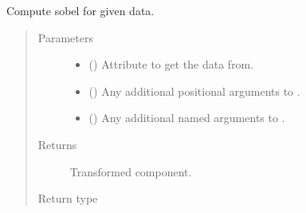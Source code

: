 \documentclass[letterpaper,10pt,english]{sphinxmanual}
\begin{document}
\begin{fulllineitems}
\begin{fulllineitems}
\label{\detokenize{api/states:geology.src.States.sobel}}
Compute sobel for given data.
\begin{quote}\begin{description}
\item[{Parameters}] \leavevmode\begin{itemize}
\item {} 
 (\sphinxstyleliteralemphasis{\sphinxupquote{, }}) \textendash{} Attribute to get the data from.

\item {} 
 () \textendash{} Any additional positional arguments to .

\item {} 
 () \textendash{} Any additional named arguments to .

\end{itemize}

\item[{Returns}] \leavevmode
{} \textendash{} Transformed component.

\item[{Return type}] \leavevmode
{\hyperref[\detokenize{api/base_classes:geology.src.base_spatial.SpatialComponent}]{}}

\end{description}\end{quote}

\end{fulllineitems}



\end{fulllineitems}
\end{document}
